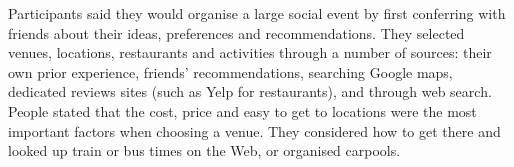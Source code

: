 \documentclass{sigchi}
\begin{document}

Participants said they would organise a large social event by first conferring with friends about their ideas, preferences and recommendations.  They selected venues, locations, restaurants and activities through a number of sources: their own prior experience, friends' recommendations, searching Google maps, dedicated reviews sites (such as Yelp for restaurants), and through web search.  People stated that the cost, price and easy to get to locations were the most important factors when choosing a venue.  They considered how to get there and looked up train or bus times on the Web, or organised carpools.  

\end{document}
